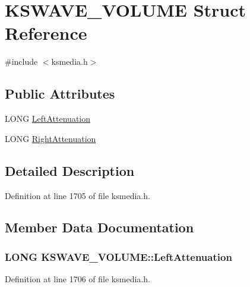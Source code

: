 \hypertarget{struct_k_s_w_a_v_e___v_o_l_u_m_e}{}\section{K\+S\+W\+A\+V\+E\+\_\+\+V\+O\+L\+U\+ME Struct Reference}
\label{struct_k_s_w_a_v_e___v_o_l_u_m_e}


{\ttfamily \#include $<$ksmedia.\+h$>$}

\subsection*{Public Attributes}
\begin{DoxyCompactItemize}
\item 
L\+O\+NG \hyperlink{struct_k_s_w_a_v_e___v_o_l_u_m_e_a060a1f80483b64dd93d3511aefb18a1b}{Left\+Attenuation}
\item 
L\+O\+NG \hyperlink{struct_k_s_w_a_v_e___v_o_l_u_m_e_a9131fa04b9d17df369ef05ff8930461e}{Right\+Attenuation}
\end{DoxyCompactItemize}


\subsection{Detailed Description}


Definition at line 1705 of file ksmedia.\+h.



\subsection{Member Data Documentation}
\subsubsection[{\texorpdfstring{Left\+Attenuation}{LeftAttenuation}}]{\setlength{\rightskip}{0pt plus 5cm}L\+O\+NG K\+S\+W\+A\+V\+E\+\_\+\+V\+O\+L\+U\+M\+E\+::\+Left\+Attenuation}\hypertarget{struct_k_s_w_a_v_e___v_o_l_u_m_e_a060a1f80483b64dd93d3511aefb18a1b}{}\label{struct_k_s_w_a_v_e___v_o_l_u_m_e_a060a1f80483b64dd93d3511aefb18a1b}


Definition at line 1706 of file ksmedia.\+h.

